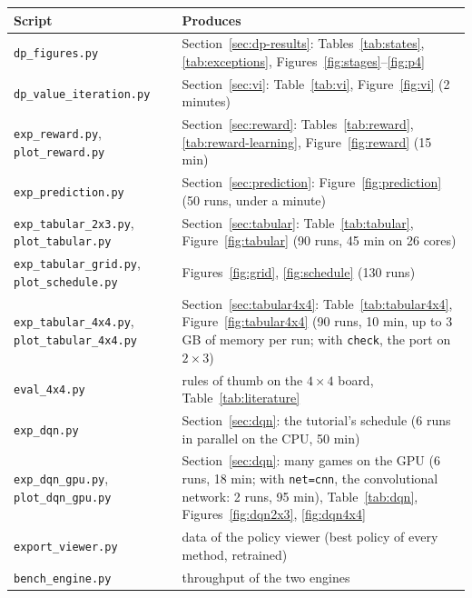 \documentclass[11pt,a4paper]{article}
\theoremstyle{remark}
\begin{document}
\begin{center}\small
\begin{tabular}{>{\raggedright\arraybackslash}p{5.4cm}>{\raggedright\arraybackslash}p{9.6cm}}
\toprule
Script & Produces\\
\midrule
\texttt{dp\_figures.py} & Section~\ref{sec:dp-results}: Tables~\ref{tab:states}, \ref{tab:exceptions}, Figures~\ref{fig:stages}--\ref{fig:p4}\\
\texttt{dp\_value\_iteration.py} & Section~\ref{sec:vi}: Table~\ref{tab:vi}, Figure~\ref{fig:vi} (2 minutes)\\
\texttt{exp\_reward.py}, \texttt{plot\_reward.py} & Section~\ref{sec:reward}: Tables~\ref{tab:reward}, \ref{tab:reward-learning}, Figure~\ref{fig:reward} (15 min)\\
\texttt{exp\_prediction.py} & Section~\ref{sec:prediction}: Figure~\ref{fig:prediction} (50 runs, under a minute)\\
\texttt{exp\_tabular\_2x3.py}, \texttt{plot\_tabular.py} & Section~\ref{sec:tabular}: Table~\ref{tab:tabular}, Figure~\ref{fig:tabular} (90 runs, 45 min on 26 cores)\\
\texttt{exp\_tabular\_grid.py}, \texttt{plot\_schedule.py} & Figures~\ref{fig:grid}, \ref{fig:schedule} (130 runs)\\
\texttt{exp\_tabular\_4x4.py}, \texttt{plot\_tabular\_4x4.py} & Section~\ref{sec:tabular4x4}: Table~\ref{tab:tabular4x4}, Figure~\ref{fig:tabular4x4} (90 runs, 10 min, up to 3 GB of memory per run; with \texttt{check}, the port on $2\times3$)\\
\texttt{eval\_4x4.py} & rules of thumb on the $4\times4$ board, Table~\ref{tab:literature}\\
\texttt{exp\_dqn.py} & Section~\ref{sec:dqn}: the tutorial's schedule (6 runs in parallel on the CPU, 50 min)\\
\texttt{exp\_dqn\_gpu.py}, \texttt{plot\_dqn\_gpu.py} & Section~\ref{sec:dqn}: many games on the GPU (6 runs, 18 min; with \texttt{net=cnn}, the convolutional network: 2 runs, 95 min), Table~\ref{tab:dqn}, Figures~\ref{fig:dqn2x3}, \ref{fig:dqn4x4}\\
\texttt{export\_viewer.py} & data of the policy viewer (best policy of every method, retrained)\\
\texttt{bench\_engine.py} & throughput of the two engines\\
\bottomrule
\end{tabular}
\end{center}
\end{document}
